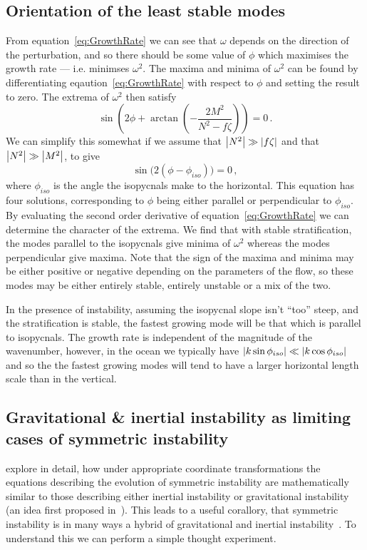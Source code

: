     \subsection{Orientation of the least stable modes}
    From equation~\ref{eq:GrowthRate} we can see that $\omega$ depends on the direction of the perturbation, and so there should be some value of $\phi$ which maximises the growth rate --- i.e. minimses $\omega^2$. The maxima and minima of $\omega^2$ can be found by differentiating eqaution~\ref{eq:GrowthRate} with respect to $\phi$ and setting the result to zero. The extrema of $\omega^2$ then satisfy
    \begin{equation}
        \sin(2 \phi + \arctan(-\frac{2M^2}{N^2 - f \zeta})) = 0 \, .
    \end{equation}
    We can simplify this somewhat if we assume that $\abs{N^2} \gg \abs{f \zeta}$ and that $\abs{N^2} \gg \abs{M^2}$, to give
    \begin{equation}
        \label{eq:UnstableDirections}
        \sin\big(2(\phi - \phi_{iso})\big) = 0 \, ,
    \end{equation}
    where $\phi_{iso}$ is the angle the isopycnals make to the horizontal. This equation has four solutions, corresponding to $\phi$ being either parallel or perpendicular to $\phi_{iso}$. By evaluating the second order derivative of equation~\ref{eq:GrowthRate} we can determine the character of the extrema. We find that with stable stratification, the modes parallel to the isopycnals give minima of $\omega^2$ whereas the modes perpendicular give maxima. Note that the sign of the maxima and minima may be either positive or negative depending on the parameters of the flow, so these modes may be either entirely stable, entirely unstable or a mix of the two.

    In the presence of instability, assuming the isopycnal slope isn't ``too'' steep, and the stratification is stable, the fastest growing mode will be that which is parallel to isopycnals. The growth rate is independent of the magnitude of the wavenumber, however, in the ocean we typically have $\abs{k \sin\phi_{iso}} \ll \abs{k \cos\phi_{iso}}$ and so the the fastest growing modes will tend to have a larger horizontal length scale than in the vertical.

    \subsection{Gravitational \& inertial instability as limiting cases of symmetric instability}
    \citet{Xu1985} explore in detail, how under appropriate coordinate transformations the equations describing the evolution of symmetric instability are mathematically similar to those describing either inertial instability or gravitational instability (an idea first proposed in~\citet{Hoskins1974}). This leads to a useful corallory, that symmetric instability is in many ways a hybrid of gravitational and inertial instability~\citep[e.g.][]{Haine1998}. To understand this we can perform a simple thought experiment.

